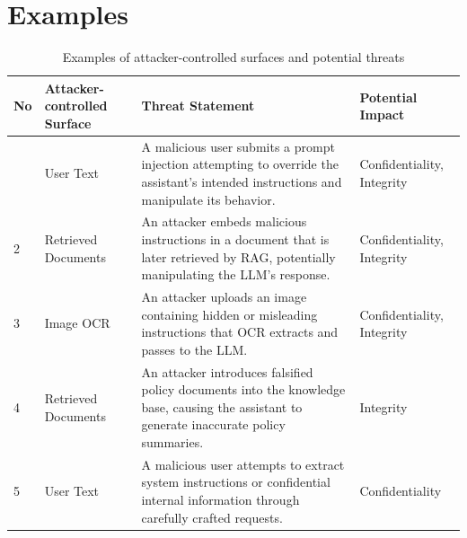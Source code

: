 \documentclass[a4paper,12pt]{report}
\begin{document}
\chapter{Examples}
\label{chap:examples}
\begin{table}[H]
    \centering
    \small
    \renewcommand{\arraystretch}{1.3}
    \begin{tabularx}{\textwidth}{
        |>{\centering\arraybackslash}p{0.7cm}
        |>{\raggedright\arraybackslash}p{2.7cm}
        |X
        |>{\raggedright\arraybackslash}p{2.5cm}|
    }
        \hline
        \textbf{No} &
        \textbf{Attacker-controlled Surface} &
        \textbf{Threat Statement} &
        \textbf{Potential Impact} \\
        \hline

        1 &
        User Text &
        A malicious user submits a prompt injection attempting to override the assistant's intended instructions and manipulate its behavior. &
        Confidentiality, Integrity \\
        \hline

        2 &
        Retrieved Documents &
        An attacker embeds malicious instructions in a document that is later retrieved by RAG, potentially manipulating the LLM's response. &
        Confidentiality, Integrity \\
        \hline

        3 &
        Image OCR &
        An attacker uploads an image containing hidden or misleading instructions that OCR extracts and passes to the LLM. &
        Confidentiality, Integrity \\
        \hline

        4 &
        Retrieved Documents &
        An attacker introduces falsified policy documents into the knowledge base, causing the assistant to generate inaccurate policy summaries. &
        Integrity \\
        \hline

        5 &
        User Text &
        A malicious user attempts to extract system instructions or confidential internal information through carefully crafted requests. &
        Confidentiality \\
        \hline
    \end{tabularx}
    \caption{Examples of attacker-controlled surfaces and potential threats}
    \label{tab:attacker_surfaces}
\end{table}
\end{document}
